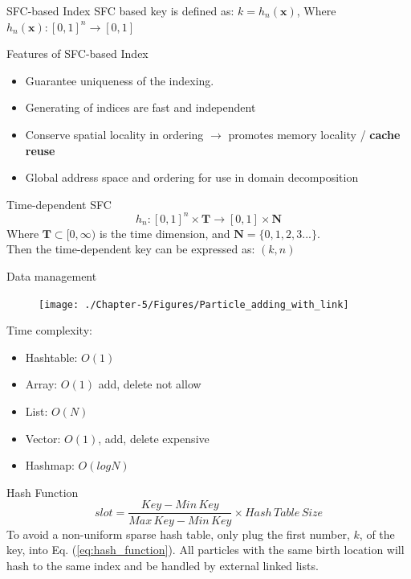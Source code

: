 \documentclass{beamer}
\begin{document}
\begin{frame}{SFC-based Index}
SFC based key is defined as: $k = h_n (\textbf{x})$, Where $h_n (\textbf{x}): [0,1]^n \rightarrow [0,1]$
\begin{block}{Features of SFC-based Index}
  \begin{itemize}
  \item {
    Guarantee uniqueness of the indexing.
  }
  \item {
    Generating of indices are fast and
independent
  }
  \item {
    Conserve spatial locality in ordering $\rightarrow$ promotes memory locality / {\bf cache reuse}
  }
  \item {
    Global address space and ordering for use in  domain decomposition
  }
  \end{itemize}
\end{block}

\begin{block}{Time-dependent SFC}
\begin{equation}
h_n: [0,1]^n \times \textbf{T} \rightarrow [0,1] \times \textbf{N}
\end{equation}
Where $\textbf{T} \subset [0,\infty)$ is the time dimension, and $\textbf{N}=\lbrace 0, 1, 2, 3...\rbrace$. \\
Then the time-dependent key can be expressed as: $(k,n)$
\end{block}
\end{frame}

\begin{frame}{Data management}
\begin{minipage}{0.66 \textwidth}
\begin{figure}
\texttt{[image: ./Chapter-5/Figures/Particle\_adding\_with\_link]}
\end{figure}
\end{minipage}
\begin{minipage}{0.33 \textwidth} 
\small
Time complexity: 

\begin{itemize}
\item Hashtable: $O(1)$
\item Array: $O(1)$ add, delete not allow
\item List: $O(N)$
\item Vector: $O(1)$, add, delete expensive
\item Hashmap: $O(logN)$
\end{itemize}

\end{minipage}
\small
\begin{block}{Hash Function}
\begin{equation}
slot= \frac{Key - Min\,Key}{Max\,Key - Min\,Key} 
\times Hash\,Table\,Size 
\label{eq:hash_function}
\end{equation}
To avoid a non-uniform sparse hash table, only plug the first number, $k$, of the key, into Eq. (\ref{eq:hash_function}). All particles with the same birth location will hash to the same index and be handled by external linked lists.
\end{block}
\end{frame}
\end{document}
